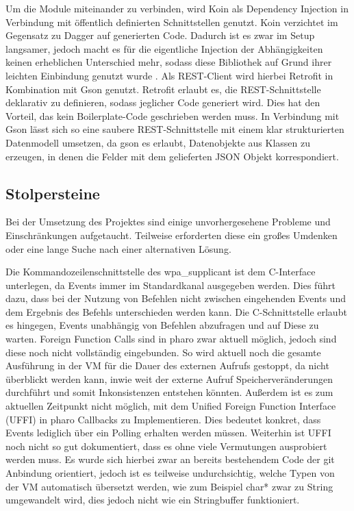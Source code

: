 		Um die Module miteinander zu verbinden, wird Koin \cite{androidKoin} als Dependency Injection in Verbindung mit öffentlich definierten Schnittstellen genutzt. Koin verzichtet im Gegensatz zu Dagger auf generierten Code. Dadurch ist es zwar im Setup langsamer, jedoch macht es für die eigentliche Injection der Abhängigkeiten keinen erheblichen Unterschied mehr, sodass diese Bibliothek auf Grund ihrer leichten Einbindung genutzt wurde \cite{androidKoinSpeed}. Als REST-Client wird hierbei Retrofit in Kombination mit Gson genutzt. Retrofit erlaubt es, die REST-Schnittstelle deklarativ zu definieren, sodass jeglicher Code generiert wird. Dies hat den Vorteil, das kein Boilerplate-Code geschrieben werden muss. In Verbindung mit Gson lässt sich so eine saubere REST-Schnittstelle mit einem klar strukturierten Datenmodell umsetzen, da gson es erlaubt, Datenobjekte aus Klassen zu erzeugen, in denen die Felder mit dem gelieferten JSON Objekt korrespondiert.

	\subsection{Stolpersteine}
		Bei der Umsetzung des Projektes sind einige unvorhergesehene Probleme und Einschränkungen aufgetaucht. Teilweise erforderten diese ein großes Umdenken oder eine lange Suche nach einer alternativen Lösung.
		
		Die Kommandozeilenschnittstelle	des wpa\_supplicant ist dem C-Interface unterlegen, da Events immer im Standardkanal ausgegeben werden. Dies führt dazu, dass bei der Nutzung von Befehlen nicht zwischen eingehenden Events und dem Ergebnis des Befehls unterschieden werden kann. Die C-Schnittstelle erlaubt es hingegen, Events unabhängig von Befehlen abzufragen und auf Diese zu warten. Foreign Function Calls sind in pharo zwar aktuell möglich, jedoch sind diese noch nicht vollständig eingebunden. So wird aktuell noch die gesamte Ausführung in der VM für die Dauer des externen Aufrufs gestoppt, da nicht überblickt werden kann, inwie weit der externe Aufruf Speicherveränderungen durchführt und somit Inkonsistenzen entstehen könnten. Außerdem ist es zum aktuellen Zeitpunkt nicht möglich, mit dem Unified Foreign Function Interface (UFFI) in pharo Callbacks zu Implementieren. Dies bedeutet konkret, dass Events lediglich über ein Polling erhalten werden müssen.
		Weiterhin ist UFFI noch nicht so gut dokumentiert, dass es ohne viele Vermutungen ausprobiert werden muss. Es wurde sich hierbei zwar an bereits bestehendem Code der git Anbindung orientiert, jedoch ist es teilweise undurchsichtig, welche Typen von der VM automatisch übersetzt werden, wie zum Beispiel char* zwar zu String umgewandelt wird, dies jedoch nicht wie ein Stringbuffer funktioniert.
		
